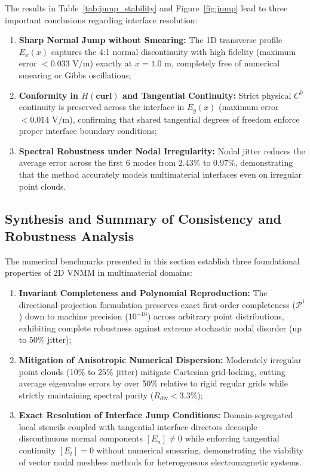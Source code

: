 \documentclass[11pt,a4paper]{article}
\begin{document}
The results in Table~\ref{tab:jump_stability} and Figure~\ref{fig:jump} lead to three important conclusions regarding interface resolution:
\begin{enumerate}
  \item \textbf{Sharp Normal Jump without Smearing:} The 1D transverse profile $E_x(x)$ captures the 4:1 normal discontinuity with high fidelity (maximum error $< 0.033\text{ V/m}$) exactly at $x = 1.0\text{ m}$, completely free of numerical smearing or Gibbs oscillations;
  \item \textbf{Conformity in $H(\mathbf{curl})$ and Tangential Continuity:} Strict physical $C^0$ continuity is preserved across the interface in $E_y(x)$ (maximum error $< 0.014\text{ V/m}$), confirming that shared tangential degrees of freedom enforce proper interface boundary conditions;
  \item \textbf{Spectral Robustness under Nodal Irregularity:} Nodal jitter reduces the average error across the first 6 modes from $2.43\%$ to $0.97\%$, demonstrating that the method accurately models multimaterial interfaces even on irregular point clouds.
\end{enumerate}

\subsection{Synthesis and Summary of Consistency and Robustness Analysis}
The numerical benchmarks presented in this section establish three foundational properties of 2D VNMM in multimaterial domains:
\begin{enumerate}
  \item \textbf{Invariant Completeness and Polynomial Reproduction:} The directional-projection formulation preserves exact first-order completeness ($\mathcal{P}^1$) down to machine precision ($10^{-16}$) across arbitrary point distributions, exhibiting complete robustness against extreme stochastic nodal disorder (up to 50\% jitter);
  \item \textbf{Mitigation of Anisotropic Numerical Dispersion:} Moderately irregular point clouds (10\% to 25\% jitter) mitigate Cartesian grid-locking, cutting average eigenvalue errors by over 50\% relative to rigid regular grids while strictly maintaining spectral purity ($R_{\mathrm{div}} < 3.3\%$);
  \item \textbf{Exact Resolution of Interface Jump Conditions:} Domain-segregated local stencils coupled with tangential interface directors decouple discontinuous normal components $[E_n] \neq 0$ while enforcing tangential continuity $[E_t] = 0$ without numerical smearing, demonstrating the viability of vector nodal meshless methods for heterogeneous electromagnetic systems.
\end{enumerate}
\end{document}
